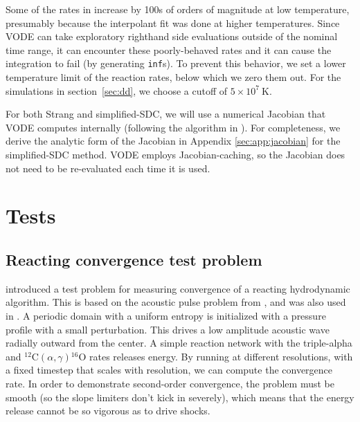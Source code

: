 \documentclass[times,preprint]{aastex631}
\newcommand{\isotm}[2]{{}^{#2}\mathrm{#1}}
\begin{document}
Some of the rates in \citet{reaclib} increase by 100s of orders of
magnitude at low temperature, presumably because the interpolant fit was done at
higher temperatures.  Since VODE can take exploratory righthand side evaluations
outside of the nominal time range, it can encounter these poorly-behaved rates
and it can cause the integration to fail (by generating {\tt inf}s).  To prevent
this behavior, we set a lower temperature limit of the reaction rates, below
which we zero them out.  For the simulations in section~\ref{sec:dd}, we choose a cutoff of
$5\times 10^7~\mathrm{K}$.


For both Strang and simplified-SDC, we will use a numerical Jacobian that VODE
computes internally (following the algorithm in \citealt{lsode}).  For
completeness, we derive the analytic form of the Jacobian in Appendix
\ref{sec:app:jacobian} for the simplified-SDC method. VODE employs
Jacobian-caching, so the Jacobian does not need to be re-evaluated each time it
is used.


\section{Tests}

\subsection{Reacting convergence test problem}

\citet{castro_sdc} introduced a test problem for measuring convergence
of a reacting hydrodynamic algorithm.  This is based on the acoustic
pulse problem from \citet{mccorquodalecolella}, and was also used in
\citet{strang_rnaas}.  A periodic domain with a uniform entropy is
initialized with a pressure profile with a small perturbation.  This
drives a low amplitude acoustic wave radially outward from the center.
A simple reaction network with the triple-alpha and
$\isotm{C}{12}(\alpha,\gamma)\isotm{O}{16}$ rates releases energy.  By
running at different resolutions, with a fixed timestep that scales
with resolution, we can compute the convergence rate.  In order to
demonstrate second-order convergence, the problem must be smooth (so
the slope limiters don't kick in severely), which means that the
energy release cannot be so vigorous as to drive shocks.



\end{document}
